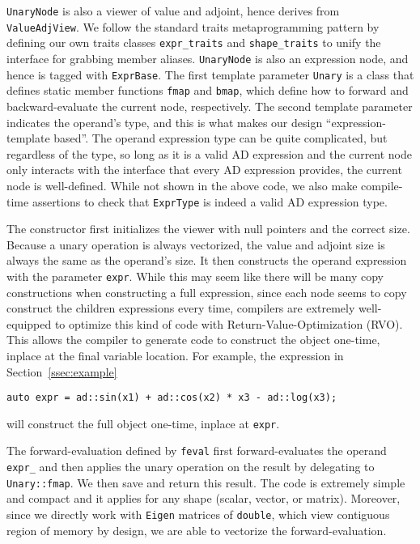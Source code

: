 \verb|UnaryNode| is also a viewer of value and adjoint,
hence derives from \verb|ValueAdjView|.
We follow the standard traits metaprogramming pattern by defining our own
traits classes \verb|expr_traits| and \verb|shape_traits| to unify the interface
for grabbing member aliases.
\verb|UnaryNode| is also an expression node, and hence is tagged with \verb|ExprBase|.
The first template parameter \verb|Unary| is a class that defines
static member functions \verb|fmap| and \verb|bmap|,
which define how to forward and backward-evaluate the current node, respectively.
The second template parameter indicates the operand's type,
and this is what makes our design ``expression-template based''.
The operand expression type can be quite complicated, but regardless of the type,
so long as it is a valid AD expression and the current node only interacts with the interface
that every AD expression provides, the current node is well-defined.
While not shown in the above code, we also make compile-time assertions
to check that \verb|ExprType| is indeed a valid AD expression type.

The constructor first initializes the viewer with null pointers and the correct size.
Because a unary operation is always vectorized,
the value and adjoint size is always the same as the operand's size.
It then constructs the operand expression with the parameter \verb|expr|.
While this may seem like there will be many copy constructions when constructing a full expression,
since each node seems to copy construct the children expressions every time,
compilers are extremely well-equipped to optimize this kind of code with 
Return-Value-Optimization (RVO).
This allows the compiler to generate code to construct the object 
one-time, inplace at the final variable location.
For example, the expression in Section~\ref{ssec:example}
\begin{lstlisting}[style=customcpp]
    auto expr = ad::sin(x1) + ad::cos(x2) * x3 - ad::log(x3);
\end{lstlisting}
will construct the full object one-time, inplace at \verb|expr|.

The forward-evaluation defined by \verb|feval| first
forward-evaluates the operand \verb|expr_| and then applies the unary operation
on the result by delegating to \verb|Unary::fmap|.
We then save and return this result.
The code is extremely simple and compact and it applies for any shape (scalar, vector, or matrix).
Moreover, since we directly work with \verb|Eigen| matrices of \verb|double|, 
which view contiguous region of memory by design,
we are able to vectorize the forward-evaluation.

